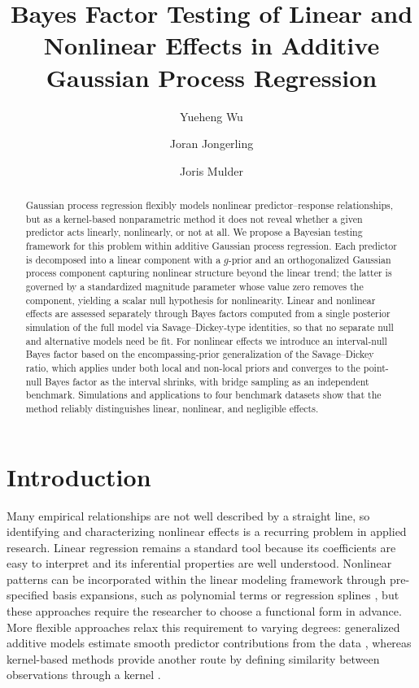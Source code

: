 \documentclass{article}
\title{\textbf{Bayes Factor Testing of Linear and Nonlinear Effects in Additive Gaussian Process Regression}}
\author[1]{Yueheng Wu}
\author[2]{Joran Jongerling}
\author[3]{Joris Mulder}
\affil[1,2,3]{Department of Methodology and Statistics, Tilburg University}
\date{}
\begin{document}
\maketitle

\begin{abstract}
Gaussian process regression flexibly models nonlinear predictor--response relationships, but as a kernel-based nonparametric method it does not reveal whether a given predictor acts linearly, nonlinearly, or not at all. We propose a Bayesian testing framework for this problem within additive Gaussian process regression. Each predictor is decomposed into a linear component with a $g$-prior and an orthogonalized Gaussian process component capturing nonlinear structure beyond the linear trend; the latter is governed by a standardized magnitude parameter whose value zero removes the component, yielding a scalar null hypothesis for nonlinearity. Linear and nonlinear effects are assessed separately through Bayes factors computed from a single posterior simulation of the full model via Savage--Dickey-type identities, so that no separate null and alternative models need be fit. For nonlinear effects we introduce an interval-null Bayes factor based on the encompassing-prior generalization of the Savage--Dickey ratio, which applies under both local and non-local priors and converges to the point-null Bayes factor as the interval shrinks, with bridge sampling as an independent benchmark. Simulations and applications to four benchmark datasets show that the method reliably distinguishes linear, nonlinear, and negligible effects.
\end{abstract}


\section{Introduction}

Many empirical relationships are not well described by a straight line, so identifying and characterizing nonlinear effects is a recurring problem in applied research. Linear regression remains a standard tool because its coefficients are easy to interpret and its inferential properties are well understood. Nonlinear patterns can be incorporated within the linear modeling framework through pre-specified basis expansions, such as polynomial terms or regression splines \parencite{stone1997use}, but these approaches require the researcher to choose a functional form in advance. More flexible approaches relax this requirement to varying degrees: generalized additive models estimate smooth predictor contributions from the data \parencite{hastie1990generalized}, whereas kernel-based methods provide another route by defining similarity between observations through a kernel \parencite{scholkopf2001learning}.
\end{document}
